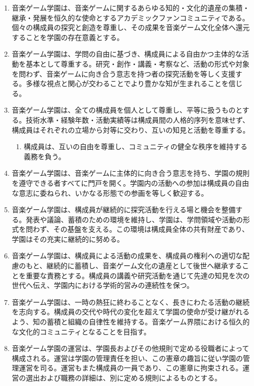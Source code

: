 \begin{enumerate}[label=第\arabic*条　]
  \item 音楽ゲーム学園は、音楽ゲームに関するあらゆる知的・文化的遺産の集積・継承・発展を恒久的な使命とするアカデミックファンコミュニティである。個々の構成員の探究と創造を尊重し、その成果を音楽ゲーム文化全体へ還元することを学園の存在意義とする。
  \item 音楽ゲーム学園は、学問の自由に基づき、構成員による自由かつ主体的な活動を基本として尊重する。研究・創作・講義・考察など、活動の形式や対象を問わず、音楽ゲームに向き合う意志を持つ者の探究活動を等しく支援する。多様な視点と関心が交わることでより豊かな知が生まれることを信じる。
  \item 音楽ゲーム学園は、全ての構成員を個人として尊重し、平等に扱うものとする。技術水準・経験年数・活動実績等は構成員間の人格的序列を意味せず、構成員はそれぞれの立場から対等に交わり、互いの知見と活動を尊重する。
    \begin{enumerate}[label=\arabic*　,start=2,leftmargin=*]
      \item 構成員は、互いの自由を尊重し、コミュニティの健全な秩序を維持する義務を負う。
    \end{enumerate}
  \item 音楽ゲーム学園は、音楽ゲームに主体的に向き合う意志を持ち、学園の規則を遵守できる者すべてに門戸を開く。学園内の活動への参加は構成員の自由な意志に委ねられ、いかなる形態での参画を等しく歓迎する。
  \item 音楽ゲーム学園は、構成員が継続的に探究活動を行える場と機会を整備する。発表や議論、蓄積のための環境を維持し、学園は、学問領域や活動の形式を問わず、その基盤を支える。この環境は構成員全体の共有財産であり、学園はその充実に継続的に努める。
  \item 音楽ゲーム学園は、構成員による活動の成果を、構成員の権利への適切な配慮のもと、継続的に蓄積し、音楽ゲーム文化の遺産として後世へ継承することを重要な責務とする。構成員の講義や研究活動を通じて先達の知見を次の世代へ伝え、学園内における学術的営みの連続性を保つ。
  \item 音楽ゲーム学園は、一時の熱狂に終わることなく、長きにわたる活動の継続を志向する。構成員の交代や時代の変化を超えて学園の使命が受け継がれるよう、知の蓄積と組織の自律性を維持する。音楽ゲーム界隈における恒久的な文化的コミュニティとなることを目指す。
  \item 音楽ゲーム学園の運営は、学園長およびその他規則で定める役職者によって構成される。運営は学園の管理責任を担い、この憲章の趣旨に従い学園の管理運営を司る。運営もまた構成員の一員であり、この憲章に拘束される。運営の選出および職務の詳細は、別に定める規則によるものとする。

\end{enumerate}
